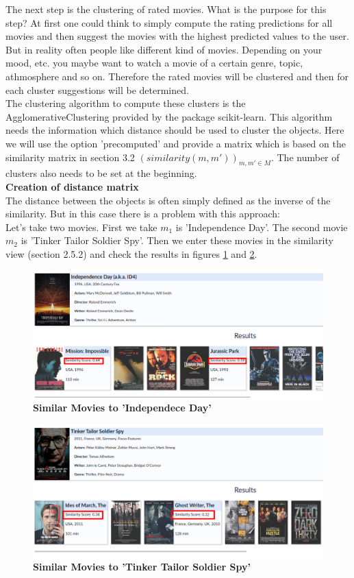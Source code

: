 \documentclass{article}
\begin{document}
The next step is the clustering of rated movies. What is the purpose for this step? At first one could think to simply compute the rating predictions for all movies and then suggest the movies with the highest predicted values to the user. But in reality often people like different kind of movies. Depending on your mood, etc. you maybe want to watch a movie of a certain genre, topic, athmosphere and so on. Therefore the rated movies will be clustered and then for each cluster suggestions will be determined.\\
The clustering algorithm to compute these clusters is the AgglomerativeClustering provided by the package scikit-learn. This algorithm needs the information which distance should be used to cluster the objects. Here we will use the option 'precomputed' and provide a matrix which is based on the similarity matrix in section 3.2 $(similarity(m,m'))_{m,m'\in M}$. The number of clusters also needs to be set at the beginning.\\[2ex]
\textbf{Creation of distance matrix}\\[2ex]
The distance between the objects is often simply defined as the inverse of the similarity. But in this case there is a problem with this approach:\\
Let's take two movies. First we take $m_1$ is 'Independence Day'. The second movie $m_2$ is 'Tinker Tailor Soldier Spy'. Then we enter these movies in the similarity view (section 2.5.2) and check the results in figures \ref{fig_sec3_similarity_1} and \ref{fig_sec3_similarity_2}.
\begin{figure}[t!]
\includegraphics[scale=0.38]{screenshots_app/sec3_similarity_1.png}
\caption{\textbf{Similar Movies to 'Independece Day'}}\label{fig_sec3_similarity_1}
\end{figure}
\begin{figure}[t!]
\includegraphics[scale=0.38]{screenshots_app/sec3_similarity_2.png}
\caption{\textbf{Similar Movies to 'Tinker Tailor Soldier Spy'}}\label{fig_sec3_similarity_2}
\end{figure}
\end{document}
